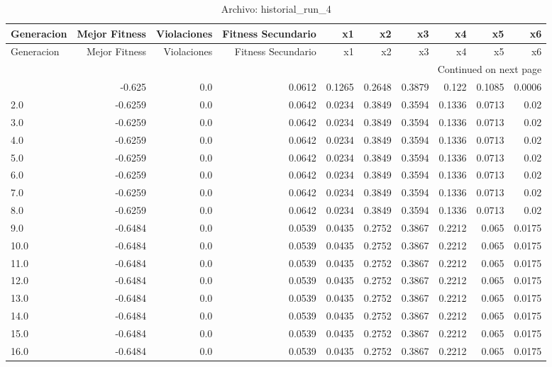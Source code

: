 \begin{longtable}{lrrrrrrrrr}
\caption{Archivo: historial\_run\_4}\label{tab:historial_run_4} \\
\toprule
Generacion & Mejor Fitness & Violaciones & Fitness Secundario & x1 & x2 & x3 & x4 & x5 & x6 \\
\midrule
\endfirsthead
\toprule
Generacion & Mejor Fitness & Violaciones & Fitness Secundario & x1 & x2 & x3 & x4 & x5 & x6 \\
\midrule
\endhead
\midrule
\multicolumn{10}{r}{Continued on next page} \\
\midrule
\endfoot
\bottomrule
\endlastfoot
1.0 & -0.625 & 0.0 & 0.0612 & 0.1265 & 0.2648 & 0.3879 & 0.122 & 0.1085 & 0.0006 \\
2.0 & -0.6259 & 0.0 & 0.0642 & 0.0234 & 0.3849 & 0.3594 & 0.1336 & 0.0713 & 0.02 \\
3.0 & -0.6259 & 0.0 & 0.0642 & 0.0234 & 0.3849 & 0.3594 & 0.1336 & 0.0713 & 0.02 \\
4.0 & -0.6259 & 0.0 & 0.0642 & 0.0234 & 0.3849 & 0.3594 & 0.1336 & 0.0713 & 0.02 \\
5.0 & -0.6259 & 0.0 & 0.0642 & 0.0234 & 0.3849 & 0.3594 & 0.1336 & 0.0713 & 0.02 \\
6.0 & -0.6259 & 0.0 & 0.0642 & 0.0234 & 0.3849 & 0.3594 & 0.1336 & 0.0713 & 0.02 \\
7.0 & -0.6259 & 0.0 & 0.0642 & 0.0234 & 0.3849 & 0.3594 & 0.1336 & 0.0713 & 0.02 \\
8.0 & -0.6259 & 0.0 & 0.0642 & 0.0234 & 0.3849 & 0.3594 & 0.1336 & 0.0713 & 0.02 \\
9.0 & -0.6484 & 0.0 & 0.0539 & 0.0435 & 0.2752 & 0.3867 & 0.2212 & 0.065 & 0.0175 \\
10.0 & -0.6484 & 0.0 & 0.0539 & 0.0435 & 0.2752 & 0.3867 & 0.2212 & 0.065 & 0.0175 \\
11.0 & -0.6484 & 0.0 & 0.0539 & 0.0435 & 0.2752 & 0.3867 & 0.2212 & 0.065 & 0.0175 \\
12.0 & -0.6484 & 0.0 & 0.0539 & 0.0435 & 0.2752 & 0.3867 & 0.2212 & 0.065 & 0.0175 \\
13.0 & -0.6484 & 0.0 & 0.0539 & 0.0435 & 0.2752 & 0.3867 & 0.2212 & 0.065 & 0.0175 \\
14.0 & -0.6484 & 0.0 & 0.0539 & 0.0435 & 0.2752 & 0.3867 & 0.2212 & 0.065 & 0.0175 \\
15.0 & -0.6484 & 0.0 & 0.0539 & 0.0435 & 0.2752 & 0.3867 & 0.2212 & 0.065 & 0.0175 \\
16.0 & -0.6484 & 0.0 & 0.0539 & 0.0435 & 0.2752 & 0.3867 & 0.2212 & 0.065 & 0.0175 \\

\end{longtable}

